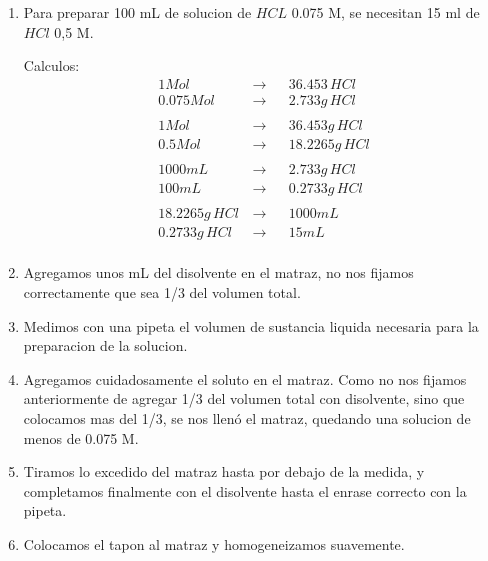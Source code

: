 \documentclass[12pt,a4paper]{report}
\begin{document}
\chapter{}
\begin{enumerate}[label=\alph*]
  \item Para preparar 100 mL de solucion de $HCL$ 0.075 M, se necesitan 15 ml de $HCl$ 0,5 M.

  Calculos:
      $$
\begin{aligned}
   1 Mol  \, &\rightarrow&& 36.453 \,HCl\\[6pt]
   0.075 Mol  \, &\rightarrow&&  2.733g \,HCl\\[6pt]
    \\
   1 Mol  \, &\rightarrow&& 36.453g \,HCl\\[6pt]
   0.5 Mol  \, &\rightarrow&&  18.2265g \,HCl\\[6pt]
    \\
   1000mL \,  &\rightarrow&& 2.733g \,HCl\\[6pt]
    100mL\,  &\rightarrow&& 0.2733g \,HCl\\[6pt]
    \\
   18.2265g \,HCl \,  &\rightarrow&& 1000 mL\\[6pt]
    0.2733 g \,HCl &\rightarrow&& 15 mL\\[6pt]
\end{aligned}
$$

  \item Agregamos unos mL del disolvente en el matraz, no nos fijamos correctamente que sea 1/3 del volumen total.

  \item Medimos con una pipeta el volumen de sustancia liquida necesaria para la preparacion de la solucion.

  \item Agregamos cuidadosamente el soluto en el matraz. Como no nos fijamos anteriormente de agregar 1/3 del volumen total con disolvente, sino que colocamos mas del 1/3, se nos llenó el matraz, quedando una solucion de menos de 0.075 M.

  \item Tiramos lo excedido del matraz hasta por debajo de la medida, y completamos finalmente con el disolvente hasta el enrase correcto con la pipeta.

  \item Colocamos el tapon al matraz y homogeneizamos suavemente.
\end{enumerate}

\chapter{}
\end{document}
